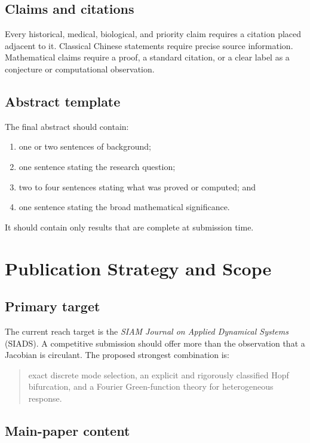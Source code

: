 \documentclass[11pt, reqno]{amsart}
\theoremstyle{definition}
\theoremstyle{remark}
\begin{document}
	\subsection{Claims and citations}
	
	Every historical, medical, biological, and priority claim requires a citation
	placed adjacent to it.  Classical Chinese statements require precise source
	information.  Mathematical claims require a proof, a standard citation, or a
	clear label as a conjecture or computational observation.
	
	\subsection{Abstract template}
	
	The final abstract should contain:
	\begin{enumerate}[label=(\arabic*),leftmargin=2.5em]
		\item one or two sentences of background;
		\item one sentence stating the research question;
		\item two to four sentences stating what was proved or computed; and
		\item one sentence stating the broad mathematical significance.
	\end{enumerate}
	It should contain only results that are complete at submission time.
	
	\section{Publication Strategy and Scope}
	\label{app:publication}
	
	\subsection{Primary target}
	
	The current reach target is the \emph{SIAM Journal on Applied Dynamical Systems}
	(SIADS).  A competitive submission should offer more than the observation that
	a Jacobian is circulant.  The proposed strongest combination is:
	\begin{quote}
		exact discrete mode selection, an explicit and rigorously classified Hopf
		bifurcation, and a Fourier Green-function theory for heterogeneous response.
	\end{quote}
	
	\subsection{Main-paper content}
	
\end{document}
